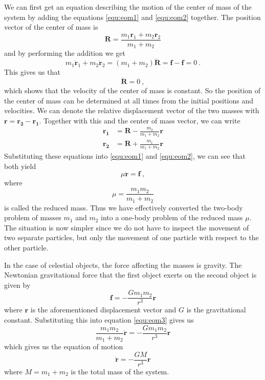 \documentclass[english, oneside]{HYgradu}
\begin{document}
We can first get an equation describing the motion of the center of mass of the system by adding the equations \ref{equ:eom1} and \ref{equ:eom2} together. The position vector of the center of mass is
\begin{equation}
\mathbf{R} = \frac{m_1 \mathbf{r}_1 + m_2 \mathbf{r}_2}{m_1 + m_2}
\end{equation}
and by performing the addition we get
\begin{equation}
m_1 \mathbf{\ddot{r}}_1 + m_2 \mathbf{\ddot{r}}_2 = (m_1 + m_2) \mathbf{\ddot{R}} = \mathbf{f} - \mathbf{f} = 0 \ .
\end{equation}
This gives us that
\begin{equation}
\mathbf{\ddot{R}} = 0 \ ,
\end{equation}
which shows that the velocity of the center of mass is constant. So the position of the center of mass can be determined at all times from the initial positions and velocities. We can denote the relative displacement vector of the two masses with $\mbox{$\mathbf{r} = \mathbf{r_2} - \mathbf{r_1}$}$. Together with this and the center of mass vector, we can write
\begin{align}
\mathbf{r_1} &= \mathbf{R} - \frac{m_2}{m_1 + m_2}\mathbf{r} \\
\mathbf{r_2} &= \mathbf{R} + \frac{m_1}{m_1 + m_2}\mathbf{r}
\end{align}
Substituting these equations into \ref{equ:eom1} and \ref{equ:eom2}, we can see that both yield 
\begin{equation}
\mu \mathbf{\ddot{r}} = \mathbf{f} \ , \label{equ:eom3}
\end{equation}
where
\begin{equation}
\mu = \frac{m_1 m_2}{m_1 + m_2}
\end{equation}
is called the reduced mass. Thus we have effectively converted the two-body problem of masses $m_1$ and $m_2$ into a one-body problem of the reduced mass $\mu$. The situation is now simpler since we do not have to inspect the movement of two separate particles, but only the movement of one particle with respect to the other particle.

In the case of celestial objects, the force affecting the masses is gravity. The Newtonian gravitational force that the first object exerts on the second object is given by
\begin{equation}
\mathbf{f} = -\frac{G m_1 m_2}{r^3} \mathbf{r}
\end{equation}
where $\mathbf{r}$ is the aforementioned displacement vector and $G$ is the gravitational constant. Substituting this into equation \ref{equ:eom3} gives us
\begin{equation}
\frac{m_1 m_2}{m_1 + m_2} \mathbf{\ddot{r}} = -\frac{G m_1 m_2}{r^3} \mathbf{r}
\end{equation}
which gives us the equation of motion
\begin{equation}
\mathbf{\ddot{r}} = -\frac{G M}{r^3} \mathbf{r} \label{equ:eomgravity}
\end{equation}
where $M = m_1 + m_2$ is the total mass of the system.
\end{document}
